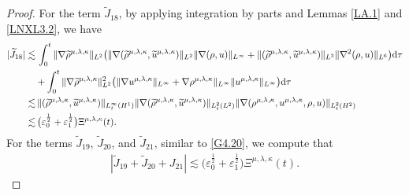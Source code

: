 \documentclass[reqno,11pt]{amsart}
\theoremstyle{plain}
\numberwithin{equation}{section}
\newcommand{\eps}{{\varepsilon}}
\begin{document}
\begin{proof}
For the term $\widetilde{J}_{18}$, by applying integration by parts and Lemmas \ref{LA.1} and \ref{LNXL3.2}, we have  
\begin{align}\label{G4.20}
|\widetilde{J}_{18}|\lesssim&\,     \int_0^t\|\nabla\widetilde{\rho}^{\mu,\lambda,\kappa}\|_{L^2}\big(\|\nabla(\widetilde{\rho}^{\mu,\lambda,\kappa},\widetilde{u}^{\mu,\lambda,\kappa})\|_{L^2}\|\nabla (\rho,u)\|_{L^\infty}+\|(\widetilde{\rho}^{\mu,\lambda,\kappa},\widetilde{u}^{\mu,\lambda,\kappa})\|_{L^3}\|\nabla^2 (\rho,u)\|_{L^6}\big){\rm d}\tau\nonumber\\
&+\int_0^t\|\nabla\widetilde{\rho}^{\mu,\lambda,\kappa}\|_{L^2}^2  \big(\|\nabla u^{\mu,\lambda,\kappa}\|_{L^{\infty}}+\nabla \rho^{\mu,\lambda,\kappa}\|_{L^{\infty}}\|  u^{\mu,\lambda,\kappa}\|_{L^{\infty}}\big) {\rm d}\tau \nonumber\\
\lesssim&\, \|(\widetilde{\rho}^{\mu,\lambda,\kappa},\widetilde{u}^{\mu,\lambda,\kappa})\|_{L_t^\infty(H^1)} \|\nabla (\widetilde{\rho}^{\mu,\lambda,\kappa},\widetilde{u}^{\mu,\lambda,\kappa} ) \|_{L_t^2(L^2)}  \|\nabla ({\rho}^{\mu,\lambda,\kappa},{u}^{\mu,\lambda,\kappa},\rho,u)\|_{L_t^2(H^2)} \nonumber\\
\lesssim&\,  \big(\eps_0^\frac{1}{2}+\eps_1^\frac{1}{2}\big){\Xi} ^{\mu,\lambda,\kappa}(t).
\end{align}  
 For the terms $\widetilde{J}_{19}$, $\widetilde{J}_{20}$, and $\widetilde{J}_{21}$, similar to \eqref{G4.20}, we compute that
\begin{align}\label{G4.21}
 |\widetilde{J}_{19}+\widetilde{J}_{20}+J_{21}|\lesssim \big(\eps_0^\frac{1}{2}+\eps_1^\frac{1}{2}\big){\Xi} ^{\mu,\lambda,\kappa}(t).
\end{align}  




\end{proof}
\end{document}
